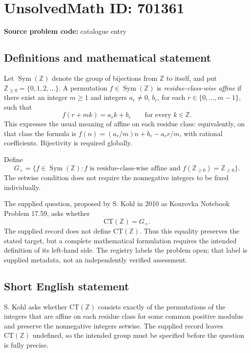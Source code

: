 \documentclass[11pt]{article}
\newcommand{\Z}{\mathbb{Z}}
\begin{document}
\section*{UnsolvedMath ID: 701361}
\textbf{Source problem code:} catalogue entry
\subsection{Definitions and mathematical statement}
Let \(\operatorname{Sym}(\Z)\) denote the group of bijections from \(\Z\) to itself, and put \(\Z_{\geq 0}=\{0,1,2,\ldots\}\). A permutation \(f\in\operatorname{Sym}(\Z)\) is \emph{residue-class-wise affine} if there exist an integer \(m\geq 1\) and integers \(a_r\neq 0\), \(b_r\), for each \(r\in\{0,\ldots,m-1\}\), such that
\[
 f(r+mk)=a_rk+b_r\qquad\text{for every }k\in\Z.
\]
This expresses the usual meaning of affine on each residue class: equivalently, on that class the formula is \(f(n)=(a_r/m)n+b_r-a_rr/m\), with rational coefficients. Bijectivity is required globally.

Define
\[
 G_+=\bigl\{f\in\operatorname{Sym}(\Z): f\text{ is residue-class-wise affine and }f(\Z_{\geq0})=\Z_{\geq0}\bigr\}.
\]
The setwise condition does not require the nonnegative integers to be fixed individually.

The supplied question, proposed by S. Kohl in 2010 as Kourovka Notebook Problem 17.59, asks whether
\[
 \mathrm{CT}(\Z)=G_+.
\]
The supplied record does not define \(\mathrm{CT}(\Z)\). Thus this equality preserves the stated target, but a complete mathematical formulation requires the intended definition of its left-hand side. The registry labels the problem open; that label is supplied metadata, not an independently verified assessment.
\subsection{Short English statement}
S. Kohl asks whether \(\mathrm{CT}(\Z)\) consists exactly of the permutations of the integers that are affine on each residue class for some common positive modulus and preserve the nonnegative integers setwise. The supplied record leaves \(\mathrm{CT}(\Z)\) undefined, so the intended group must be specified before the question is fully precise.
\end{document}
